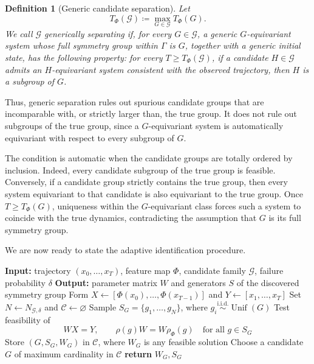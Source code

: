 \documentclass[11pt]{article}
\theoremstyle{plain}
\newtheorem{definition}[theorem]{Definition}
\theoremstyle{definition}
\theoremstyle{remark}
\begin{document}
\begin{definition}[Generic candidate separation]
\label{def:candidate_separation}
Let
\[
T_\Phi(\mathcal G)
\coloneqq
\max_{G\in\mathcal G}T_\Phi(G).
\]
We call \(\mathcal G\) \emph{generically separating} if, for every
\(G\in\mathcal G\), a generic \(G\)-equivariant system whose full symmetry
group within \(\Gamma\) is \(G\), together with a generic initial state, has
the following property: for every \(T\ge T_\Phi(\mathcal G)\), if a candidate
\(H\in\mathcal G\) admits an \(H\)-equivariant system consistent with the
observed trajectory, then \(H\) is a subgroup of \(G\).
\end{definition}

Thus, generic separation rules out spurious candidate groups that are
incomparable with, or strictly larger than, the true group. It does not rule
out subgroups of the true group, since a \(G\)-equivariant system is
automatically equivariant with respect to every subgroup of \(G\).

The condition is automatic when the candidate groups are totally ordered by
inclusion. Indeed, every candidate subgroup of the true group is feasible.
Conversely, if a candidate group strictly contains the true group, then every
system equivariant to that candidate is also equivariant to the true group.
Once \(T\ge T_\Phi(G)\), uniqueness within the \(G\)-equivariant class forces
such a system to coincide with the true dynamics, contradicting the assumption
that \(G\) is its full symmetry group.

We are now ready to state the adaptive identification procedure.

\begin{algorithm}[t]
\caption{Adaptive symmetry discovery}
\label{alg:adaptive}
\begin{algorithmic}[1]
\STATE \textbf{Input:} trajectory \((x_0,\ldots,x_T)\), feature map
\(\Phi\), candidate family \(\mathcal G\), failure probability \(\delta\)
\STATE \textbf{Output:} parameter matrix \(W\) and generators \(S\) of the
discovered symmetry group
\STATE Form
\(X\gets[\Phi(x_0),\ldots,\Phi(x_{T-1})]\) and
\(Y\gets[x_1,\ldots,x_T]\)
\STATE Set \(N\gets N_{\mathcal G,\delta}\) and
\(\mathcal C\gets\varnothing\)
    \STATE Sample \(S_G=\{g_1,\ldots,g_N\}\), where
    \(g_i\overset{\mathrm{i.i.d.}}{\sim}\operatorname{Unif}(G)\)
    \STATE Test feasibility of
    \[
    WX=Y,\qquad
    \rho(g)W=W\rho_\Phi(g)
    \quad\text{for all }g\in S_G
    \]
        \STATE Store \((G,S_G,W_G)\) in \(\mathcal C\), where \(W_G\)
        is any feasible solution
    \ENDIF
\ENDFOR
\STATE Choose a candidate \(G\) of maximum cardinality in \(\mathcal C\)
\STATE \textbf{return} \(W_G,S_G\)
\end{algorithmic}
\end{algorithm}
\end{document}
